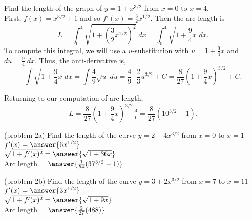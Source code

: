 \documentclass[handout]{ximera}
\begin{document}
\begin{example}[example 2]
 Find the length of the graph of 
$y = 1+ x^{3/2}$ 
from  $x = 0$ to $x = 4$.\\
First, $f(x) = x^{3/2} + 1$ and so $f'(x) = \frac32 x^{1/2}$. 
Then the arc length is
\[
L = \int_0^4 \sqrt{1 + \left(\frac32 x^{1/2}\right)^2} \; dx = \int_0^4 \sqrt{1 + \frac94 x} \;dx.
\]
To compute this integral, we will use a $u$-substitution with $u = 1+\frac94 x$ and $du = \frac94 \; dx$.
Thus, the anti-derivative is,
\[
\int \sqrt{1+\frac94 x} \; dx = \int \frac49 \sqrt u \; du = \frac49 \cdot \frac23 u^{3/2} + C = \frac{8}{27} \left(1 + \frac94 x \right)^{3/2} + C.
\]

Returning to our computation of arc length, 
\[
L = \frac{8}{27} \left(1 + \frac94 x \right)^{3/2} \bigg|_0^4 = \frac{8}{27} (10^{3/2} - 1).
\]
\end{example}


\begin{problem}(problem 2a)
Find the length of the curve $y = 2 + 4x^{3/2}$ from $x = 0$ to $x = 1$\\

$f'(x) = \answer{6x^{1/2}}$\\

$\sqrt{1+f'(x)^2} = \answer{\sqrt{1+ 36x}}$\\

Arc length = $\answer{\frac{1}{54} (37^{3/2} -1)}$
\end{problem}



\begin{problem}(problem 2b)
Find the length of the curve $y = 3 + 2x^{3/2}$ from $x = 7$ to $x = 11$\\

$f'(x) = \answer{3x^{1/2}}$\\

$\sqrt{1+f'(x)^2} = \answer{\sqrt{1+ 9x}}$\\

Arc length = $\answer{\frac{2}{27} (488)}$
\end{problem}
\end{document}
